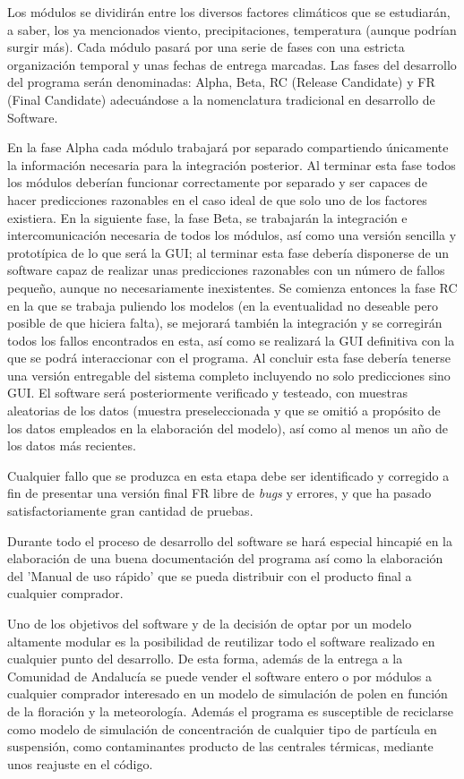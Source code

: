 \documentclass[12pt,oneside,a4paper]{article}
\numberwithin{figure}{section}
\begin{document}
Los módulos se dividirán entre los diversos factores climáticos que se estudiarán, a saber, los ya mencionados viento, precipitaciones, temperatura (aunque podrían surgir más). Cada módulo pasará por una serie de fases con una estricta organización temporal y unas fechas de entrega marcadas. Las fases del desarrollo del programa serán denominadas: Alpha, Beta, RC (Release Candidate) y FR (Final Candidate) adecuándose a la nomenclatura tradicional en desarrollo de Software.

En la fase Alpha cada módulo trabajará por separado compartiendo únicamente la información necesaria para la integración posterior. Al terminar esta fase todos los módulos deberían funcionar correctamente por separado y ser capaces de hacer predicciones razonables en el caso ideal de que solo uno de los factores existiera. En la siguiente fase, la fase Beta, se trabajarán la integración e intercomunicación necesaria de todos los módulos, así como una versión sencilla y prototípica de lo que será la GUI; al terminar esta fase debería disponerse de un software capaz de realizar unas predicciones razonables con un número de fallos pequeño, aunque no necesariamente inexistentes. Se comienza entonces la fase RC en la que se trabaja puliendo los modelos (en la eventualidad no deseable pero posible de que hiciera falta), se mejorará también la integración y se corregirán todos los fallos encontrados en esta, así como se realizará la GUI definitiva con la que se podrá interaccionar con el programa. Al concluir esta fase debería tenerse una versión entregable del sistema completo incluyendo no solo predicciones sino GUI. El software será posteriormente verificado y testeado, con muestras aleatorias de los datos (muestra preseleccionada y que se omitió a propósito de los datos empleados en la elaboración del modelo), así como al menos un año de los datos más recientes.

Cualquier fallo que se produzca en esta etapa debe ser identificado y corregido a fin de presentar una versión final FR libre de \textit{bugs} y errores, y que ha pasado satisfactoriamente gran cantidad de pruebas.

Durante todo el proceso de desarrollo del software se hará especial hincapié en la elaboración de una buena documentación del programa así como la elaboración del 'Manual de uso rápido' que se pueda distribuir con el producto final a cualquier comprador.

Uno de los objetivos del software y de la decisión de optar por un modelo altamente modular es la posibilidad de reutilizar todo el software realizado en cualquier punto del desarrollo. De esta forma, además de la entrega a la Comunidad de Andalucía se puede vender el software entero o por módulos a cualquier comprador interesado en un modelo de simulación de polen en función de la floración y la meteorología. Además el programa es susceptible de reciclarse como modelo de simulación de concentración de cualquier tipo de partícula en suspensión, como contaminantes producto de las centrales térmicas, mediante unos reajuste en el código.
\end{document}

